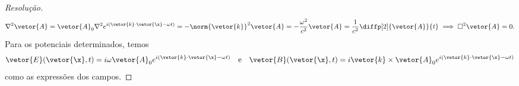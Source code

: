 \begin{proof}[Resolução]
   \begin{equation*}
      \nabla^2 \vetor{A} = \vetor{A}_0 \nabla^2 e^{i(\vetor{k}\cdot \vetor{\x} - \omega t)} = - \norm{\vetor{k}}^2 \vetor{A} = - \frac{\omega^2}{c^2} \vetor{A} = \frac{1}{c^2} \diffp[2]{\vetor{A}}{t} \implies \Box^2 \vetor{A} = 0.
   \end{equation*}
   Para os potenciais determinados, temos
   \begin{equation*}
      \vetor{E}(\vetor{\x},t) = i \omega \vetor{A}_0 e^{i(\vetor{k}\cdot\vetor{\x} - \omega t)}
      \quad\text{e}\quad
      \vetor{B}(\vetor{\x},t) = i \vetor{k} \times \vetor{A}_0 e^{i(\vetor{k}\cdot\vetor{\x} - \omega t)}
   \end{equation*}
   como as expressões dos campos.
\end{proof}
